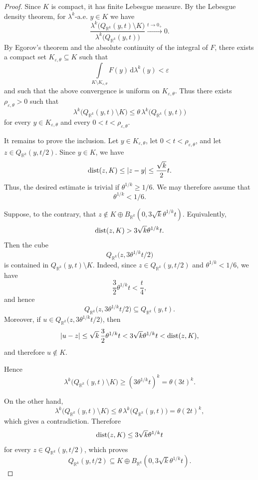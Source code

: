 \documentclass[pdflatex,sn-mathphys-num]{sn-jnl}
\theoremstyle{plain}
\theoremstyle{definition}
\DeclareMathOperator{\dist}{\textup{dist}}
\newcommand{\dlambda}[1]{\,\mathrm d\lambda^{#1}}
\begin{document}
\begin{proof}
Since $K$ is compact, it has finite Lebesgue measure. By the Lebesgue density
theorem, for $\lambda^k$-a.e. $y\in K$ we have
\[
\frac{\lambda^k\big(Q_{\mathbb{R}^k}(y, t)\setminus K\big)}{\lambda^k\big(Q_{\mathbb{R}^k}(y, t)\big)}\xrightarrow{t\to0_+}0.
\]
By Egorov's theorem and the absolute continuity of the integral of $F$, there
exists a compact set $K_{\varepsilon, \theta}\subseteq K$ such that
\[
\int\limits_{K\setminus K_{\varepsilon, \theta}}F(y)\dlambda{k}(y)<\varepsilon
\]
and such that the above convergence is uniform on $K_{\varepsilon, \theta}$.
Thus there exists $\rho_{\varepsilon, \theta}>0$ such that
\[
\lambda^k\big(Q_{\mathbb{R}^k}(y, t)\setminus K\big)\leq \theta\,\lambda^k\big(Q_{\mathbb{R}^k}(y, t)\big)
\]
for every $y\in K_{\varepsilon, \theta}$ and every
$0<t<\rho_{\varepsilon, \theta}$.

It remains to prove the inclusion. Let $y\in K_{\varepsilon, \theta}$,
let $0<t<\rho_{\varepsilon, \theta}$, and let $z\in Q_{\mathbb{R}^k}(y, t/2)$. Since
$y\in K$, we have
\[
\dist(z, K)\leq |z-y|\leq \frac{\sqrt{k}}{2}t.
\]
Thus, the desired estimate is trivial if
$\theta^{1/k}\geq 1/6$. We may therefore assume that
$$\theta^{1/k}<1/6.$$

Suppose, to the contrary, that $z\notin K\oplus B_{\mathbb{R}^k}(0, 3\sqrt{k}\theta^{1/k}t).$ Equivalently,
\[
\dist(z, K)>3\sqrt{k}\theta^{1/k}t.
\]
Then the cube
\[
Q_{\mathbb{R}^k}\big(z, 3\theta^{1/k}t/2\big)
\]
is contained in $Q_{\mathbb{R}^k}(y, t)\setminus K$. Indeed, since $z\in Q_{\mathbb{R}^k}(y,t/2)$ and $\theta^{1/k}<1/6$, we have \[ \frac{3}{2}\theta^{1/k}t<\frac{t}{4}, \] and hence \[ Q_{\mathbb{R}^k}\big(z,3\theta^{1/k}t/2\big)\subseteq Q_{\mathbb{R}^k}(y,t). \] Moreover, if $u\in Q_{\mathbb{R}^k}\big(z,3\theta^{1/k}t/2\big)$, then \[ |u-z|\leq \sqrt{k}\,\frac{3}{2}\theta^{1/k}t <3\sqrt{k}\theta^{1/k}t<\dist(z,K), \] and therefore $u\notin K$.


Hence
\[
\lambda^k\big(Q_{\mathbb{R}^k}(y, t)\setminus K\big)
\geq
(3\theta^{1/k}t)^k=\theta (3t)^k.
\]


On the other hand,
\[
\lambda^k\big(Q_{\mathbb{R}^k}(y, t)\setminus K\big)
\leq
\theta\,\lambda^k\big(Q_{\mathbb{R}^k}(y, t)\big)
=
\theta(2t)^k,
\]
which gives a contradiction. Therefore
\[
\dist(z, K)\leq 3\sqrt{k}\theta^{1/k}t
\]
for every $z\in Q_{\mathbb{R}^k}(y, t/2)$, which proves
\[
Q_{\mathbb{R}^k}(y, t/2)\subseteq K\oplus B_{\mathbb R^k}(0, 3\sqrt{k}\theta^{1/k}t).
\]
\end{proof}
\end{document}
